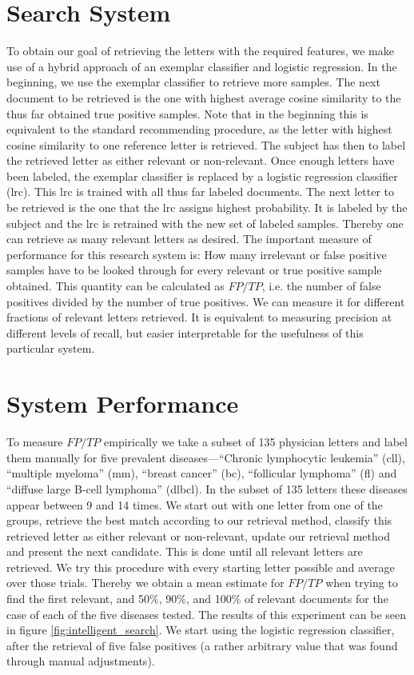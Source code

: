 \section{Search System}
To obtain our goal of retrieving the letters with the required features, we make use of a hybrid approach of an exemplar classifier and logistic regression. In the beginning, we use the exemplar classifier to retrieve more samples. The next document to be retrieved is the one with highest average cosine similarity to the thus far obtained true positive samples. Note that in the beginning this is equivalent to the standard recommending procedure, as the letter with highest cosine similarity to one reference letter is retrieved. The subject has then to label the retrieved letter as either relevant or non-relevant. Once enough letters have been labeled, the exemplar classifier is replaced by a logistic regression classifier (lrc). This lrc is trained with all thus far labeled documents. The next letter to be retrieved is the one that the lrc assigns highest probability. It is labeled by the subject and the lrc is retrained with the new set of labeled samples. Thereby one can retrieve as many relevant letters as desired. The important measure of performance for this research system is: How many irrelevant or false positive samples have to be looked through for every relevant or true positive sample obtained. This quantity can be calculated as $FP/TP$, i.e. the number of false positives divided by the number of true positives. We can measure it for different fractions of relevant letters retrieved. It is equivalent to measuring precision at different levels of recall, but easier interpretable for the usefulness of this particular system.

\section{System Performance}
To measure $FP/TP$ empirically we take a subset of 135 physician letters and label them manually for five prevalent diseases---``Chronic lymphocytic leukemia'' (cll), ``multiple myeloma'' (mm), ``breast cancer'' (bc), ``follicular lymphoma'' (fl) and ``diffuse large B-cell lymphoma'' (dlbcl). In the subset of 135 letters these diseases appear between 9 and 14 times. We start out with one letter from one of the groups, retrieve the best match according to our retrieval method, classify this retrieved letter as either relevant or non-relevant, update our retrieval method and present the next candidate. This is done until all relevant letters are retrieved. We try this procedure with every starting letter possible and average over those trials. Thereby we obtain a mean estimate for $FP/TP$ when trying to find the first relevant, and 50\%, 90\%, and 100\% of relevant documents for the case of each of the five diseases tested. The results of this experiment can be seen in figure \ref{fig:intelligent_search}. We start using the logistic regression classifier, after the retrieval of five false positives (a rather arbitrary value that was found through manual adjustments).

